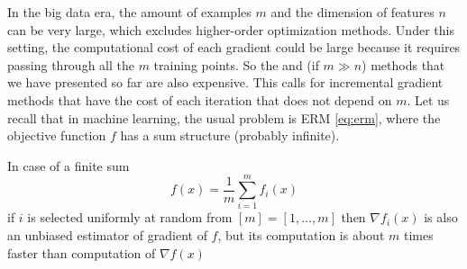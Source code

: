 In the big data era, the amount of examples $m$ and the dimension of features $n$ can be very large, which excludes higher-order optimization methods. Under this setting, the computational cost of each gradient could be large because it requires passing through all the $m$ training points. So the  and  (if $m\gg n$) methods that we have presented so far are also expensive. This calls for incremental gradient methods that have the cost of each iteration that does not depend on $m$. Let us recall that in machine learning, the usual problem is ERM \eqref{eq:erm}, where the objective function $f$ has a sum structure (probably infinite).

In case of a finite sum
$$
f(x) = \frac{1}{m}\sum_{i=1}^m f_i(x)
$$
if $i$ is selected uniformly at random from $[m] = [1,\dots,m]$ then $\nabla f_i(x)$ is also an unbiased estimator of gradient of $f$, but its computation is about $m$ times faster than  computation of $\nabla f(x)$

